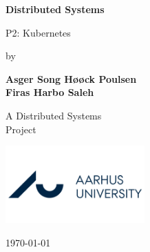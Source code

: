 \newcommand{\norm}[1]{\left\lVert#1\right\rVert}     
\newcommand\course{Distributed Systems}        %
\newcommand\hwnumber{2}                                   %
\newcommand\Information{XXX/xxxxxxxx}                     %
\begin{titlepage}
    \begin{center}
        \vspace*{3cm}
            
        \Huge
        \textbf{\course{}}
            
        \vspace{1cm}
        \huge
        P\hwnumber : Kubernetes
            
        \vspace{1.5cm}
        \Large
        by
        
        \textbf{Asger Song Høøck Poulsen} \\%
        \textbf{Firas Harbo Saleh} %
        
            
        \vfill
        
        A \course{} \\Project
            
        \vspace{0.5cm}
            
        \includegraphics[width=0.4\textwidth]{img/aarhus-university.png}
        \\
        
        \Large
        
        \today
            
    \end{center}
\end{titlepage}